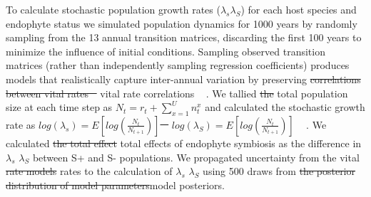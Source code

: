 \documentclass[lineno, sn-basic]{sn-jnl}%
\providecommand{\DIFadd}[1]{{\protect\color{blue}#1}} %
\providecommand{\DIFdel}[1]{{\protect\color{red}\protect\scriptsize\sout{#1}}}
\providecommand{\DIFadd}[1]{{\protect\color{blue}\uwave{#1}}} %
\providecommand{\DIFdel}[1]{{\protect\color{red}\sout{#1}}}                      %
\providecommand{\DIFaddbegin}{} %
\providecommand{\DIFaddend}{} %
\providecommand{\DIFdelbegin}{} %
\providecommand{\DIFdelend}{} %
\newcommand{\DIFscaledelfig}{0.5}
\newlength{\DIFdelgraphicswidth} %
\newlength{\DIFdelgraphicsheight} %
\newcommand{\DIFaddincludegraphics}[2][]{{\color{blue}\fbox{\DIFOincludegraphics[#1]{#2}}}} %
\newcommand{\DIFdelincludegraphics}[2][]{%
\sbox{\DIFdelgraphicsbox}{\DIFOincludegraphics[#1]{#2}}%
\settoboxwidth{\DIFdelgraphicswidth}{\DIFdelgraphicsbox} %
\settoboxtotalheight{\DIFdelgraphicsheight}{\DIFdelgraphicsbox} %
\scalebox{\DIFscaledelfig}{%
\parbox[b]{\DIFdelgraphicswidth}{\usebox{\DIFdelgraphicsbox}\\[-\baselineskip] \rule{\DIFdelgraphicswidth}{0em}}\llap{\resizebox{\DIFdelgraphicswidth}{\DIFdelgraphicsheight}{%
\setlength{\unitlength}{\DIFdelgraphicswidth}%
\begin{picture}(1,1)%
\thicklines\linethickness{2pt} %
{\color[rgb]{1,0,0}\put(0,0){\framebox(1,1){}}}%
{\color[rgb]{1,0,0}\put(0,0){\line( 1,1){1}}}%
{\color[rgb]{1,0,0}\put(0,1){\line(1,-1){1}}}%
\end{picture}%
}\hspace*{3pt}}} %
} %
\DeclareRobustCommand{\DIFaddbegin}{\DIFOaddbegin \let\includegraphics\DIFaddincludegraphics} %
\DeclareRobustCommand{\DIFaddend}{\DIFOaddend \let\includegraphics\DIFOincludegraphics} %
\DeclareRobustCommand{\DIFdelbegin}{\DIFOdelbegin \let\includegraphics\DIFdelincludegraphics} %
\DeclareRobustCommand{\DIFdelend}{\DIFOaddend \let\includegraphics\DIFOincludegraphics} %
\begin{document}
To calculate stochastic population growth rates (\DIFdelbegin \DIFdel{$\lambda_s$}\DIFdelend \DIFaddbegin \DIFadd{$\lambda_S$}\DIFaddend ) for each host species and endophyte status we simulated population dynamics for 1000 years by randomly sampling from the 13 annual transition matrices, discarding the first 100 years to minimize the influence of initial conditions. 
Sampling observed transition matrices (rather than independently sampling regression coefficients) produces models that realistically capture inter-annual variation by preserving \DIFdelbegin \DIFdel{correlations between vital rates \mbox{%
\cite{metcalf2015statistical}}\hspace{0pt}%
}\DIFdelend \DIFaddbegin \DIFadd{vital rate correlations \mbox{%
\citep{metcalf2015statistical}}\hspace{0pt}%
}\DIFaddend .
We tallied \DIFdelbegin \DIFdel{the }\DIFdelend total population size at each time step as  $N_{t} = r_{t} + \sum_{x=1}^{U}n^x_{t}$ and calculated the stochastic growth rate as \DIFdelbegin \DIFdel{$log(\lambda_s) = E[log(\frac{N_{t}}{N_{t+1}})]$ \mbox{%
\cite{caswell2001matrix,rees2009integral}}\hspace{0pt}%
}\DIFdelend \DIFaddbegin \DIFadd{$log(\lambda_S) = E[log(\frac{N_{t}}{N_{t+1}})]$ \mbox{%
\citep{caswell2001matrix,rees2009integral}}\hspace{0pt}%
}\DIFaddend .
We calculated \DIFdelbegin \DIFdel{the total effect }\DIFdelend \DIFaddbegin \DIFadd{total effects }\DIFaddend of endophyte symbiosis as the difference in \DIFdelbegin \DIFdel{$\lambda_s$ }\DIFdelend \DIFaddbegin \DIFadd{$\lambda_S$ }\DIFaddend between S+ and S- populations. 
We propagated uncertainty from the vital \DIFdelbegin \DIFdel{rate models }\DIFdelend \DIFaddbegin \DIFadd{rates }\DIFaddend to the calculation of \DIFdelbegin \DIFdel{$\lambda_s$ }\DIFdelend \DIFaddbegin \DIFadd{$\lambda_S$ }\DIFaddend using 500 draws from \DIFdelbegin \DIFdel{the posterior distribution of model parameters}\DIFdelend \DIFaddbegin \DIFadd{model posteriors}\DIFaddend .
\end{document}
